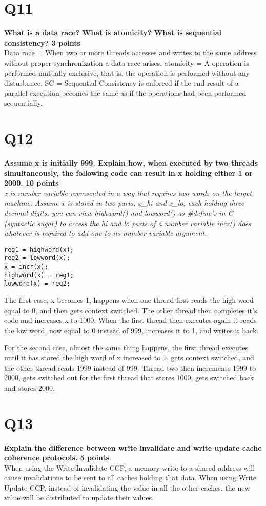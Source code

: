 \documentclass[a4paper]{article}
\begin{document}
\section*{Q11}
\large{\textbf{
What is a data race? What is atomicity? What is sequential consistency? 3 points\\}}
Data race = When two or more threads accesses and writes to the same address without proper synchronization a data race arises.
atomicity = A operation is performed mutually exclusive, that is, the operation is performed without any disturbance.  
SC = Sequential Consistency is enforced if the end result of a parallel execution becomes the same as if the operations had been performed sequentially. 

\section*{Q12}
\large{\textbf{
Assume x is initially 999. Explain how, when executed by two threads simultaneously, the following code can result in x holding either 1 or 2000. 10 points\\}}
\textit{x is number variable represented in a way that requires two words on the target machine. Assume x is stored in two parts, x\_hi and x\_lo, each holding three decimal digits. you can view highword() and lowword() as \#define’s in C (syntactic sugar) to access the hi and lo parts of a number variable incr() does whatever is required to add one to its number variable argument.}
\lstset{language=C,frame=single}
\begin{lstlisting}
reg1 = highword(x);
reg2 = lowword(x);
x = incr(x);
highword(x) = reg1;
lowword(x) = reg2; 
\end{lstlisting}
The first case, x becomes 1, happens when one thread first reads the high word equal to 0, and then gets context switched. The other thread then completes it's code and increases x to 1000. When the first thread then executes again it reads the low word, now equal to 0 instead of 999, increases it to 1, and writes it back.

For the second case, almost the same thing happens, the first thread executes until it has stored the high word of x increased to 1, gets context switched, and the other thread reads 1999 instead of 999. Thread two then increments 1999 to 2000, gets switched out for the first thread that stores 1000, gets switched back and stores 2000.  

\section*{Q13}
\large{\textbf{
Explain the difference between write invalidate and write update cache coherence protocols. 5 points\\}}
When using the Write-Invalidate CCP, a memory write to a shared address will cause invalidations to be sent to all caches holding that data. When using Write Update CCP, instead of invalidating the value in all the other caches, the new value will be distributed to update their values.
\end{document}
